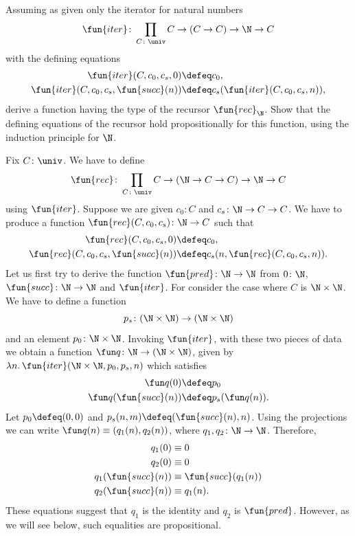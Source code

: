 \begin{exr}
    Assuming as given only the iterator for natural numbers
    \[
        \fun{iter} \colon \prod_{C\colon\univ} C \to (C \to C) \to \N \to C
    \]
    with the defining equations
    \begin{align*}
        \fun{iter}(C, c_0, c_s, 0) &\defeq c_0,\\
        \fun{iter}(C, c_0, c_s, \fun{succ}(n)) &\defeq c_s(\fun{iter}(C, c_0, c_s, n)),
    \end{align*}
    derive a function having the type of the recursor\/ $\fun{rec}_\N$. Show that the defining equations of the recursor hold propositionally for this function, using the induction principle for\/ $\N$.
\end{exr}

\begin{solution}
    Fix $C\colon\univ$. We have to define
    \[
        \fun{rec}\colon\prod_{C\colon\univ}C\to(\N\to C\to C)\to\N\to C
    \]
    using $\fun{iter}$. Suppose we are given $c_0\colon C$ and $c_s\colon\N\to C\to C$. We have to produce a function $\fun{rec}(C,c_0,c_s)\colon\N\to C$ such that
    \begin{align*}
        \fun{rec}(C,c_0,c_s,0)&\defeq c_0,\\
        \fun{rec}(C,c_0,c_s,\fun{succ}(n))
            &\defeq c_s(n,\fun{rec}(C,c_0,c_s,n)).
    \end{align*}
    Let us first try to derive the function $\fun{pred}\colon\N\to\N$ from $0\colon\N$, $\fun{succ}\colon\N\to\N$ and $\fun{iter}$. For consider the case where $C$ is $\N\times\N$. We have to define a function
    \[
        p_s\colon(\N\times\N)\to(\N\times\N)
    \]
    and an element $p_0\colon\N\times\N$. Invoking $\fun{iter}$, with these two pieces of data we obtain a function $\fun q\colon\N\to(\N\times\N)$, given by $\lambda n.\,\fun{iter}(\N\times\N,p_0,p_s,n)$ which satisfies
    \begin{align*}
        \fun q(0)&\defeq p_0\\
        \fun q(\fun{succ}(n)) &\defeq p_s(\fun q(n)).
    \end{align*}
    Let $p_0\defeq(0,0)$ and $p_s(n,m)\defeq(\fun{succ}(n),n)$. Using the projections we can write $\fun q(n)\equiv(q_1(n),q_2(n))$, where $q_1,q_2\colon\N\to\N$. Therefore,
    \begin{align*}
        q_1(0)&\equiv 0\\
        q_2(0)&\equiv 0\\
        q_1(\fun{succ}(n))&\equiv \fun{succ}(q_1(n))\\
        q_2(\fun{succ}(n))&\equiv q_1(n).
    \end{align*}
    These equations suggest that $q_1$ is the identity and $q_2$ is $\fun{pred}$. However, as we will see below, such equalities are propositional.
    

\end{solution}
